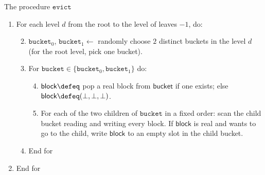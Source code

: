 \begin{algo}
\label{alg:evict}
The procedure $\texttt{evict}$

\begin{enumerate}
\item
  For each level $d$ from the root to the level of leaves $- 1$, do:

  \begin{enumerate}
  \setcounter{enumii}{1}
  \item
    $\texttt{bucket}_{0}$,
    $\texttt{bucket}_{1} \leftarrow$ randomly choose $2$
    distinct buckets in the level $d$ (for the root level, pick one
    bucket).
  \item
    For
    $\texttt{bucket} \in \{\texttt{bucket}_{0},\texttt{bucket}_{1}\}$
    do:

    \begin{enumerate}
    \setcounter{enumiii}{3}
    \item
      $\textsf{block} \defeq$ pop a real block from
      $\textsf{bucket}$ if one exists; else
      $\textsf{block} \defeq (\bot,\bot,\bot)$.
    \item
      For each of the two children of $\texttt{bucket}$ in a
      fixed order: scan the child bucket reading and writing every
      block. If $\textsf{block}$ is real and wants to go to the
      child, write $\textsf{block}$ to an empty slot in the
      child bucket.
    \end{enumerate}
  \item
    End for
  \end{enumerate}
\item
  End for
\end{enumerate}
\end{algo}
\fi
